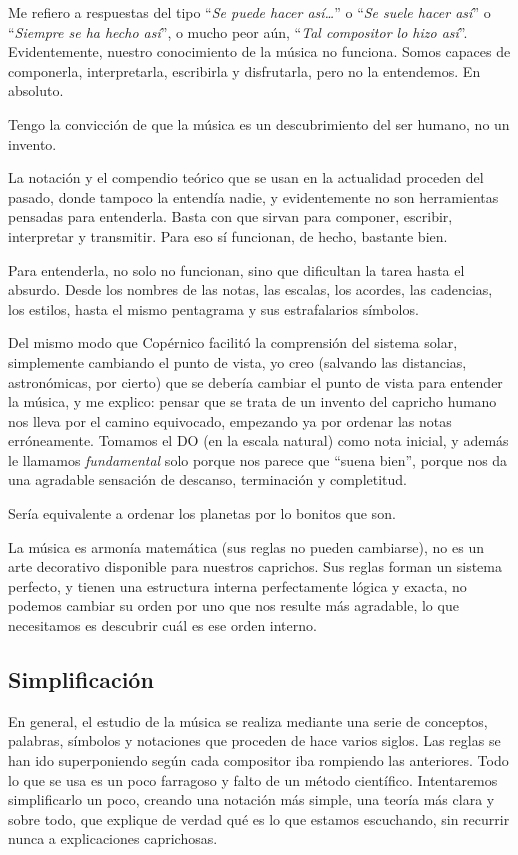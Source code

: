 \documentclass[]{article}
\begin{document}
Me refiero a respuestas del tipo ``\emph{Se puede hacer   así\ldots{}}'' o ``\emph{Se suele hacer así}'' o ``\emph{Siempre se ha   hecho así}'', o mucho peor aún, ``\emph{Tal compositor lo hizo así}''. Evidentemente, nuestro conocimiento de la música no funciona. Somos capaces de componerla, interpretarla, escribirla y disfrutarla, pero no la entendemos. En absoluto.

Tengo la convicción de que la música es un descubrimiento del ser humano, no un invento.

La notación y el compendio teórico que se usan en la actualidad proceden del pasado, donde tampoco la entendía nadie, y evidentemente no son herramientas pensadas para entenderla. Basta con que sirvan para componer, escribir, interpretar y transmitir. Para eso sí funcionan, de hecho, bastante bien.

Para entenderla, no solo no funcionan, sino que dificultan la tarea hasta el absurdo. Desde los nombres de las notas, las escalas, los acordes, las cadencias, los estilos, hasta el mismo pentagrama y sus estrafalarios símbolos.

Del mismo modo que Copérnico facilitó la comprensión del sistema solar, simplemente cambiando el punto de vista, yo creo (salvando las distancias, astronómicas, por cierto) que se debería cambiar el punto de vista para entender la música, y me explico: pensar que se trata de un invento del capricho humano nos lleva por el camino equivocado, empezando ya por ordenar las notas erróneamente. Tomamos el DO (en la escala natural) como nota inicial, y además le llamamos \emph{fundamental} solo porque nos parece que ``suena bien'', porque nos da una agradable sensación de descanso, terminación y completitud.

Sería equivalente a ordenar los planetas por lo bonitos que son.

La música es armonía matemática (sus reglas no pueden cambiarse), no es un arte decorativo disponible para nuestros caprichos. Sus reglas forman un sistema perfecto, y tienen una estructura interna perfectamente lógica y exacta, no podemos cambiar su orden por uno que nos resulte más agradable, lo que necesitamos es descubrir cuál es ese orden interno.

\subsection{Simplificación}

En general, el estudio de la música se realiza mediante una serie de conceptos, palabras, símbolos y notaciones que proceden de hace varios siglos. Las reglas se han ido superponiendo según cada compositor iba rompiendo las anteriores. Todo lo que se usa es un poco farragoso y falto de un método científico. Intentaremos simplificarlo un poco, creando una notación más simple, una teoría más clara y sobre todo, que explique de verdad qué es lo que estamos escuchando, sin recurrir nunca a explicaciones caprichosas.
\end{document}
